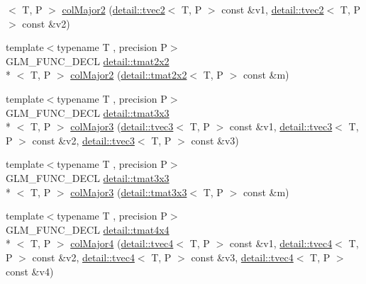 \begin{DoxyCompactItemize}
$<$ T, P $>$ \hyperlink{group__gtx__matrix__major__storage_gae53863d1ced5629d5aa3ce04abf14ab1}{col\-Major2} (\hyperlink{structglm_1_1detail_1_1tvec2}{detail\-::tvec2}$<$ T, P $>$ const \&v1, \hyperlink{structglm_1_1detail_1_1tvec2}{detail\-::tvec2}$<$ T, P $>$ const \&v2)
\item 
{\footnotesize template$<$typename T , precision P$>$ }\\G\-L\-M\-\_\-\-F\-U\-N\-C\-\_\-\-D\-E\-C\-L \hyperlink{structglm_1_1detail_1_1tmat2x2}{detail\-::tmat2x2}\\*
$<$ T, P $>$ \hyperlink{group__gtx__matrix__major__storage_ga84d93f2dea8fd341232f0505038d50f6}{col\-Major2} (\hyperlink{structglm_1_1detail_1_1tmat2x2}{detail\-::tmat2x2}$<$ T, P $>$ const \&m)
\item 
{\footnotesize template$<$typename T , precision P$>$ }\\G\-L\-M\-\_\-\-F\-U\-N\-C\-\_\-\-D\-E\-C\-L \hyperlink{structglm_1_1detail_1_1tmat3x3}{detail\-::tmat3x3}\\*
$<$ T, P $>$ \hyperlink{group__gtx__matrix__major__storage_ga8bc9dc6fcd7017b7123a151d9f251013}{col\-Major3} (\hyperlink{structglm_1_1detail_1_1tvec3}{detail\-::tvec3}$<$ T, P $>$ const \&v1, \hyperlink{structglm_1_1detail_1_1tvec3}{detail\-::tvec3}$<$ T, P $>$ const \&v2, \hyperlink{structglm_1_1detail_1_1tvec3}{detail\-::tvec3}$<$ T, P $>$ const \&v3)
\item 
{\footnotesize template$<$typename T , precision P$>$ }\\G\-L\-M\-\_\-\-F\-U\-N\-C\-\_\-\-D\-E\-C\-L \hyperlink{structglm_1_1detail_1_1tmat3x3}{detail\-::tmat3x3}\\*
$<$ T, P $>$ \hyperlink{group__gtx__matrix__major__storage_ga40caccd20b8afb6de68c626efc376927}{col\-Major3} (\hyperlink{structglm_1_1detail_1_1tmat3x3}{detail\-::tmat3x3}$<$ T, P $>$ const \&m)
\item 
{\footnotesize template$<$typename T , precision P$>$ }\\G\-L\-M\-\_\-\-F\-U\-N\-C\-\_\-\-D\-E\-C\-L \hyperlink{structglm_1_1detail_1_1tmat4x4}{detail\-::tmat4x4}\\*
$<$ T, P $>$ \hyperlink{group__gtx__matrix__major__storage_ga50e127c56370410d8054be2cdef03503}{col\-Major4} (\hyperlink{structglm_1_1detail_1_1tvec4}{detail\-::tvec4}$<$ T, P $>$ const \&v1, \hyperlink{structglm_1_1detail_1_1tvec4}{detail\-::tvec4}$<$ T, P $>$ const \&v2, \hyperlink{structglm_1_1detail_1_1tvec4}{detail\-::tvec4}$<$ T, P $>$ const \&v3, \hyperlink{structglm_1_1detail_1_1tvec4}{detail\-::tvec4}$<$ T, P $>$ const \&v4)

\end{DoxyCompactItemize}
